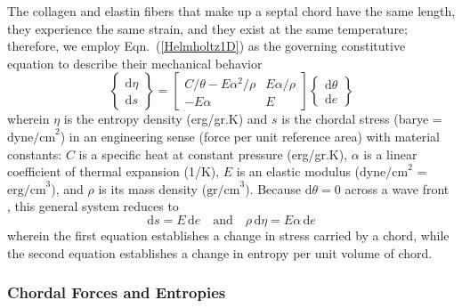 The collagen and elastin fibers that make up a septal chord have the same length, they experience the same strain, and they exist at the same temperature; therefore, we employ Eqn.~(\ref{Helmholtz1D}) as the governing constitutive equation to describe their mechanical behavior
\begin{displaymath}
\left\{ \begin{matrix} 
\mathrm{d} \eta \\ \mathrm{d} s
\end{matrix} \right\} = \begin{bmatrix}
C / \theta - E \alpha^2 / \rho & E \alpha / \rho \\
-E  \alpha & E
\end{bmatrix} \left\{ \begin{matrix}
\mathrm{d} \theta \\ \mathrm{d} e
\end{matrix} \right\} 
\end{displaymath}
wherein $\eta$ is the entropy density (erg/gr.K) and $s$ is the chordal stress (barye = $\text{dyne/cm}^2$) in an engineering sense (force per unit reference area) with material constants: $C$ is a specific heat at constant pressure (erg/gr.K), $\alpha$ is a linear coefficient of thermal expansion (1/K), $E$ is an elastic modulus ($\text{dyne/cm}^2$ = $\text{erg/cm}^3$), and $\rho$ is its mass density ($\text{gr/cm}^3$).  Because $\mathrm{d} \theta = 0$ across a wave front \cite{AmesStaff53}, this general system reduces to
\begin{displaymath} 
\mathrm{d} s = E \, \mathrm{d}e
\quad \text{and} \quad
\rho \, \mathrm{d} \eta = E \alpha \, \mathrm{d}e
\end{displaymath} 
wherein the first equation establishes a change in stress carried by a chord, while the second equation establishes a change in entropy per unit volume of chord. 

\subsubsection{Chordal Forces and Entropies}

